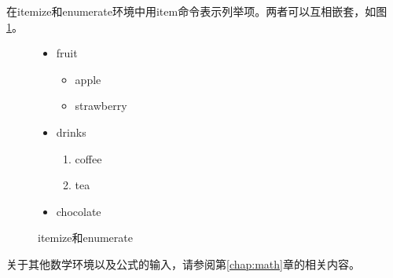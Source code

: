在itemize和enumerate环境中用item命令表示列举项。两者可以互相嵌套，如图\ref{f:item}。
\begin{figure}[!h]
\centering
{}
\hspace{0.1\textwidth}
\begin{minipage}[h]{0.4\textwidth}
\centering
\begin{code}
\begin{itemize}
    \item fruit
    \begin{itemize}
        \item apple
        \item strawberry
    \end{itemize}
    \item drinks
    \begin{enumerate}
        \item coffee
        \item tea
    \end{enumerate}
    \item chocolate
\end{itemize}
\end{code}
\end{minipage}
\caption{itemize和enumerate}
\label{f:item}
\end{figure}

关于其他数学环境以及公式的输入，请参阅第\ref{chap:math}章的相关内容。 